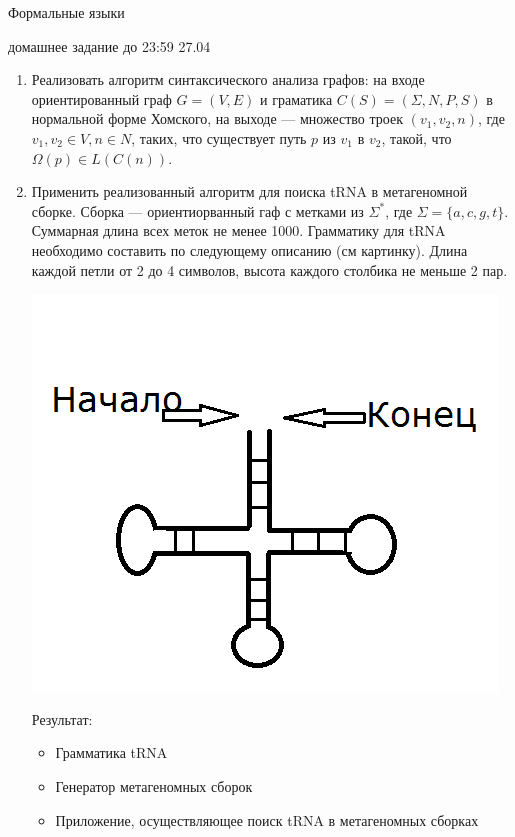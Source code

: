 \documentclass[12pt]{article}
\begin{document}
\begin{center}
  \LARGE Формальные языки 

  \Large домашнее задание до 23:59 27.04
\end{center}
\bigskip

\begin{enumerate}
  \item Реализовать алгоритм синтаксического анализа графов: на входе ориентированный граф $G=(V,E)$ и граматика $C(S)=(\Sigma, N, P, S)$ в нормальной форме Хомского, на выходе --- множество троек $(v_1,v_2,n)$, где $v_1, v_2 \in V, n \in N$, таких, что существует путь $p$ из $v_1$ в $v_2$, такой, что $\Omega(p) \in L(C(n))$.
  \item Применить реализованный алгоритм для поиска tRNA в метагеномной сборке. Сборка --- ориентиорванный гаф с метками из $\Sigma^*$, где $\Sigma=\{a,c,g,t\}$. Суммарная длина всех меток не менее 1000. Грамматику для tRNA необходимо составить по следующему описанию (см картинку). Длина каждой петли от 2 до 4 символов, высота каждого столбика не меньше 2 пар.
  \begin{center} \includegraphics[width=0.65\linewidth]{тРНК.png} \end{center}
  Результат:
  \begin{itemize}
  \item Грамматика tRNA
  \item Генератор метагеномных сборок
  \item Приложение, осуществляющее поиск tRNA в метагеномных сборках
  \end{itemize}
\end{enumerate}  


\end{document}
